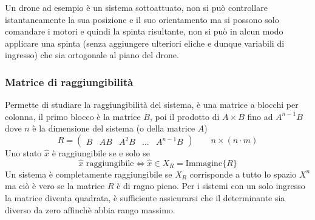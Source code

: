 Un drone ad esempio è un sistema sottoattuato, non si può controllare
istantaneamente la sua posizione e il suo orientamento ma si possono solo
comandare i motori e quindi la spinta risultante, non si può in alcun modo
applicare una spinta (senza aggiungere ulteriori eliche e dunque variabili di
ingresso) che sia ortogonale al piano del drone.

\subsubsection{Matrice di raggiungibilità}
Permette di studiare la raggiungibilità del sistema, è una matrice a blocchi
per colonna, il primo blocco è la matrice $B$, poi il prodotto di $A\times B$
fino ad $A^{n-1}B$ dove $n$ è la dimensione del sistema (o della matrice $A$)
$$
R=\left(\begin{array}{c|c|c|c|c}
   B & AB & A^2B & \dots & A^{n-1}B
  \end{array}\right)\qquad n\times(n\cdot m )
$$
Uno stato $\hat{x}$ è raggiungibile se e solo se
$$
\hat{x} \text{ raggiungibile} \Leftrightarrow \hat{x} \in X_R =
\text{Immagine}\{R\}
$$
Un sistema è completamente raggiungibile se $X_R$ corrisponde a tutto lo spazio
$X^n$ ma ciò è vero se la matrice $R$ è di ragno pieno.
Per i sistemi con un solo ingresso la matrice diventa quadrata, è sufficiente
assicurarsi che il determinante sia diverso da zero affinchè abbia rango
massimo.

